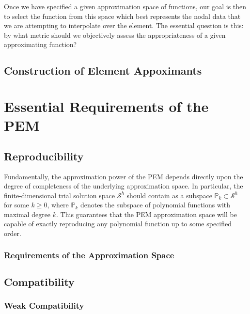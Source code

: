 Once we have specified a given approximation space of functions, our goal is then to select the function from this space which best represents the nodal data that we are attempting to interpolate over the element. The essential question is this: by what metric should we objectively assess the appropriateness of a given approximating function?

\subsection*{Construction of Element Appoximants}

\section{Essential Requirements of the PEM}

\subsection*{Reproducibility}

Fundamentally, the approximation power of the PEM depends directly upon the degree of completeness of the underlying approximation space. In particular, the finite-dimensional trial solution space $\mathcal{S}^h$ should contain as a subspace $\mathbb{P}_k \subset \mathcal{S}^h$ for some $k \geq 0$, where $\mathbb{P}_k$ denotes the subspace of polynomial functions with maximal degree $k$. This guarantees that the PEM approximation space will be capable of exactly reproducing any polynomial function up to some specified order.


\subsubsection*{Requirements of the Approximation Space}
\subsection*{Compatibility}




\subsubsection*{Weak Compatibility}
